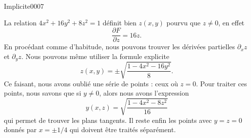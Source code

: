 
\begin{corrige}{Implicite0007}

	La relation $4x^2+16y^2+8z^2=1$ définit bien $z(x,y)$ pourvu que $z\neq 0$, en effet
	\begin{equation}
		\frac{ \partial F }{ \partial z }=16z.
	\end{equation}
	En procédant comme d'habitude, nous pouvons trouver les dérivées partielles $\partial_xz$ et $\partial_yz$. Nous pouvons même utiliser la formule explicite
	\begin{equation}
		z(x,y)=\pm\sqrt{\frac{ 1-4x^2-16y^2 }{ 8 }}.
	\end{equation}
	Ce faisant, nous avons oublié une série de points : ceux où $z=0$. Pour traiter ces points, nous savons que si $y\neq 0$, alors nous avons l'expression
	\begin{equation}
		y(x,z)=\sqrt{\frac{ 1-4x^2-8z^2 }{ 16 }}
	\end{equation}
	qui permet de trouver les plans tangents. Il reste enfin les points avec $y=z=0$ donnés par $x=\pm1/4$ qui doivent être traités séparément.

\end{corrige}
